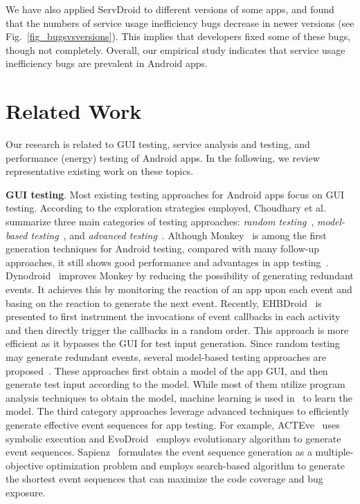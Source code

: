 \documentclass[sigconf,review, anonymous]{acmart}
\begin{document}
We have also applied \textsf{ServDroid} to different versions of some apps, and
found that the numbers of service usage inefficiency bugs decrease in newer
versions (see Fig.~\ref{fig_bugsvsversions}). This implies that developers
fixed some of these bugs, though not completely. Overall, our empirical study
indicates that service usage inefficiency bugs are prevalent in Android apps.



\section{Related Work}\label{relatedwork}
Our research is related to GUI testing, service analysis and
testing, and performance (energy) testing of Android apps. In the following, we review
representative existing work on these topics.

\textbf{GUI testing}. Most existing testing approaches for Android apps focus on GUI testing. According to the exploration strategies employed, Choudhary et al.~\cite{ChoudharyGO15} summarize three main categories of testing approaches: \textit{random testing}~\cite{monkey,HuN11,MachiryTN13,SongQH17}, \textit{model-based testing}~\cite{GUIRipping,grey-box,ChoiNS13,a3e,SuMCWYYPLS17}, and \textit{advanced testing}~\cite{AnandNHY12,JensenPM13,EvoDroid,MaoHJ16}. Although \textsf{Monkey}~\cite{monkey} is among the first generation techniques for Android testing, compared with many follow-up approaches, it still shows good performance and advantages in app testing~\cite{ChoudharyGO15}. \textsf{Dynodroid}~\cite{MachiryTN13} improves \textsf{Monkey} by reducing the possibility of generating redundant events. It achieves this by monitoring the reaction of an app upon each event and basing on the reaction to generate the next event. Recently, \textsf{EHBDroid}~\cite{SongQH17} is presented to first instrument the invocations of event callbacks in each activity and then directly trigger the callbacks in a random order. This approach is more efficient as it bypasses the GUI for test input generation. Since random testing may generate redundant events, several model-based testing approaches are proposed~\cite{AmalfitanoFT11,GUIRipping,grey-box,ChoiNS13,a3e,BaekB16,SuMCWYYPLS17}. These approaches first obtain a model of the app GUI, and then generate test input according to the model. While most of them utilize program analysis techniques to obtain the model, machine learning is used in~\cite{ChoiNS13} to learn the model. The third category approaches leverage advanced techniques to efficiently generate effective event sequences for app testing\cite{AnandNHY12,JensenPM13,EvoDroid,MaoHJ16}. For example,  \textsf{ACTEve}~\cite{AnandNHY12} uses symbolic execution and \textsf{EvoDroid}~\cite{EvoDroid} employs evolutionary algorithm to generate event sequences. \textsf{Sapienz}~\cite{MaoHJ16} formulates the event sequence generation as a multiple-objective optimization problem and employs search-based algorithm to generate the shortest event sequences that can maximize the code coverage and bug exposure.
\end{document}
